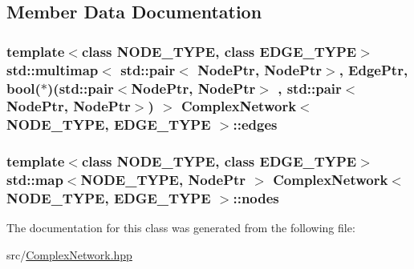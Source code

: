 \subsection{Member Data Documentation}
\hypertarget{class_complex_network_a4d2f089652d03d9cbca4d77ff04df234}{
\subsubsection[{edges}]{\setlength{\rightskip}{0pt plus 5cm}template$<$class N\+O\+D\+E\+\_\+\+T\+Y\+P\+E, class E\+D\+G\+E\+\_\+\+T\+Y\+P\+E$>$ std\+::multimap$<$ std\+::pair$<$ {\bf Node\+Ptr}, {\bf Node\+Ptr}$>$, {\bf Edge\+Ptr}, bool($\ast$)(std\+::pair$<${\bf Node\+Ptr}, {\bf Node\+Ptr}$>$ , std\+::pair$<${\bf Node\+Ptr}, {\bf Node\+Ptr}$>$) $>$ {\bf Complex\+Network}$<$ N\+O\+D\+E\+\_\+\+T\+Y\+P\+E, E\+D\+G\+E\+\_\+\+T\+Y\+P\+E $>$\+::edges\hspace{0.3cm}{\ttfamily [private]}}}\label{class_complex_network_a4d2f089652d03d9cbca4d77ff04df234}
\hypertarget{class_complex_network_a7f4748e1353c022d91092892977ad0c4}{
\subsubsection[{nodes}]{\setlength{\rightskip}{0pt plus 5cm}template$<$class N\+O\+D\+E\+\_\+\+T\+Y\+P\+E, class E\+D\+G\+E\+\_\+\+T\+Y\+P\+E$>$ std\+::map$<$N\+O\+D\+E\+\_\+\+T\+Y\+P\+E, {\bf Node\+Ptr} $>$ {\bf Complex\+Network}$<$ N\+O\+D\+E\+\_\+\+T\+Y\+P\+E, E\+D\+G\+E\+\_\+\+T\+Y\+P\+E $>$\+::nodes\hspace{0.3cm}{\ttfamily [private]}}}\label{class_complex_network_a7f4748e1353c022d91092892977ad0c4}


The documentation for this class was generated from the following file\+:\begin{DoxyCompactItemize}
\item 
src/\hyperlink{_complex_network_8hpp}{Complex\+Network.\+hpp}\end{DoxyCompactItemize}
